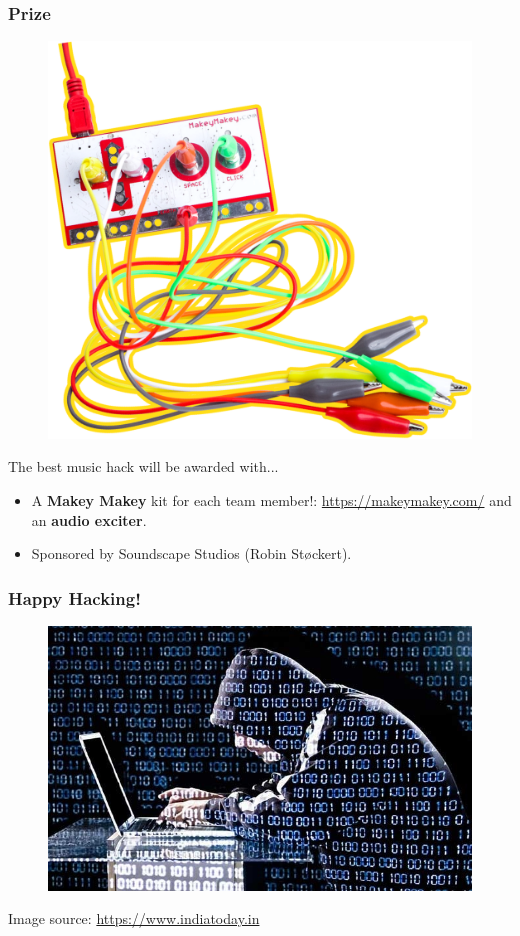 \documentclass[screen, aspectratio=169]{beamer}
\begin{document}
\begin{frame}
  \frametitle{Prize}
  \begin{figure}
	\includegraphics[scale=0.1]{img/makey-makey.png}
  \end{figure}
  The best music hack will be awarded with...
    \begin{itemize}
    	\item A \textbf{Makey Makey} kit for each team member!: \url{https://makeymakey.com/} and an \textbf{audio exciter}.
	\item Sponsored by Soundscape Studios (Robin St{\o}ckert).
    \end{itemize}
\end{frame}
%
\begin{frame}
  \frametitle{Happy Hacking!}
    \begin{figure}
	\includegraphics[scale=0.3]{img/ethical-hacking.jpg}
    \end{figure}	
    {\tiny Image source: \url{https://www.indiatoday.in}}
\end{frame}
%
\end{document}
